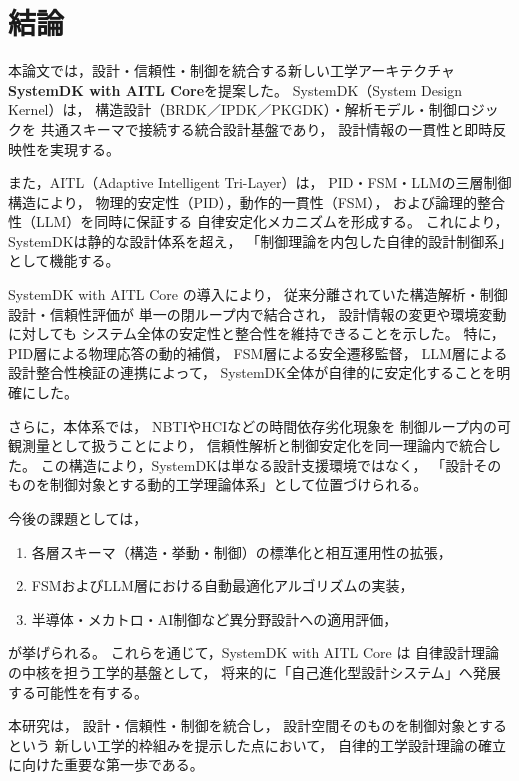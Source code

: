\section{結論}

本論文では，設計・信頼性・制御を統合する新しい工学アーキテクチャ
\textbf{SystemDK with AITL Core}を提案した。
SystemDK（System Design Kernel）は，
構造設計（BRDK／IPDK／PKGDK）・解析モデル・制御ロジックを
共通スキーマで接続する統合設計基盤であり，
設計情報の一貫性と即時反映性を実現する。

また，AITL（Adaptive Intelligent Tri-Layer）は，
PID・FSM・LLMの三層制御構造により，
物理的安定性（PID），動作的一貫性（FSM），
および論理的整合性（LLM）を同時に保証する
自律安定化メカニズムを形成する。
これにより，SystemDKは静的な設計体系を超え，
「制御理論を内包した自律的設計制御系」として機能する。

SystemDK with AITL Core の導入により，
従来分離されていた構造解析・制御設計・信頼性評価が
単一の閉ループ内で結合され，
設計情報の変更や環境変動に対しても
システム全体の安定性と整合性を維持できることを示した。
特に，PID層による物理応答の動的補償，
FSM層による安全遷移監督，
LLM層による設計整合性検証の連携によって，
SystemDK全体が自律的に安定化することを明確にした。

さらに，本体系では，
NBTIやHCIなどの時間依存劣化現象を
制御ループ内の可観測量として扱うことにより，
信頼性解析と制御安定化を同一理論内で統合した。
この構造により，SystemDKは単なる設計支援環境ではなく，
「設計そのものを制御対象とする動的工学理論体系」として位置づけられる。

今後の課題としては，
\begin{enumerate}
  \item 各層スキーマ（構造・挙動・制御）の標準化と相互運用性の拡張，
  \item FSMおよびLLM層における自動最適化アルゴリズムの実装，
  \item 半導体・メカトロ・AI制御など異分野設計への適用評価，
\end{enumerate}
が挙げられる。
これらを通じて，SystemDK with AITL Core は
自律設計理論の中核を担う工学的基盤として，
将来的に「自己進化型設計システム」へ発展する可能性を有する。

本研究は，
設計・信頼性・制御を統合し，
設計空間そのものを制御対象とするという
新しい工学的枠組みを提示した点において，
自律的工学設計理論の確立に向けた重要な第一歩である。
